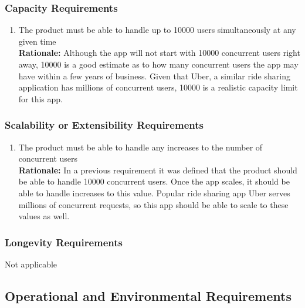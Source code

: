 \documentclass[]{article}
\begin{document}
\subsubsection{Capacity Requirements}
\label{ssub:capacity_requirements}
\begin{enumerate}[{PR-C}1. ]
	\item The product must be able to handle up to 10000 users simultaneously at any given time \\
	{\bf Rationale:} Although the app will not start with 10000 concurrent users right away, 10000 is a good estimate as to how many concurrent users the app may have within a few years of business. Given that Uber, a similar ride sharing application has millions of concurrent users, 10000 is a realistic capacity limit for this app.
\end{enumerate}

\subsubsection{Scalability or Extensibility Requirements}
\label{ssub:scalability_or_extensibility_requirements}
\begin{enumerate}[{PR-SE}1. ]
	\item The product must be able to handle any increases to the number of concurrent users \\
	{\bf Rationale:} In a previous requirement it was defined that the product should be able to handle 10000 concurrent users. Once the app scales, it should be able to handle increases to this value. Popular ride sharing app Uber serves millions of concurrent requests, so this app should be able to scale to these values as well.
\end{enumerate}

\subsubsection{Longevity Requirements}
\label{ssub:longevity_requirements}
	Not applicable


\subsection{Operational and Environmental Requirements}
\label{sub:operational_and_environmental_requirements}
\end{document}
